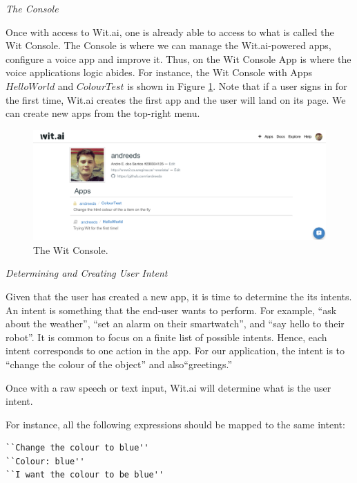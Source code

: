 \emph{The Console}

Once with access to Wit.ai, one is already able to access to what is called the Wit Console. 
The Console is where we can manage the Wit.ai-powered apps, configure a voice app and improve it.
Thus, on the Wit Console App is where the voice applications logic abides.
For instance, the Wit Console with Apps $HelloWorld$ and $ColourTest$ is shown in Figure \ref{fig:console}.
Note that if a user signs in for the first time, Wit.ai creates the first app and the user will land on its page.
We can create new apps from the top-right menu.

\begin{figure}
\label{fig:console}
\centerline{
\includegraphics[width=\textwidth]{figures/Wit_Console.png}
}
\caption{The Wit Console.}
\end{figure}

\emph{Determining and Creating User Intent}

Given that the user has created a new app, it is time to determine the its intents.
An intent is something that the end-user wants to perform.
For example,
``ask about the weather'', 
``set an alarm on their smartwatch'', and 
``say hello to their robot''.
It is common to focus on a finite list of possible intents.
Hence, each intent corresponds to one action in the app.
For our application, the intent is to ``change the colour of the object'' and also``greetings.''

Once with a raw speech or text input, Wit.ai will determine what is the user intent.

For instance, all the following expressions should be mapped to the same intent:
\begin{lstlisting}[language=html]
``Change the colour to blue''
``Colour: blue''
``I want the colour to be blue''
\end{lstlisting}


